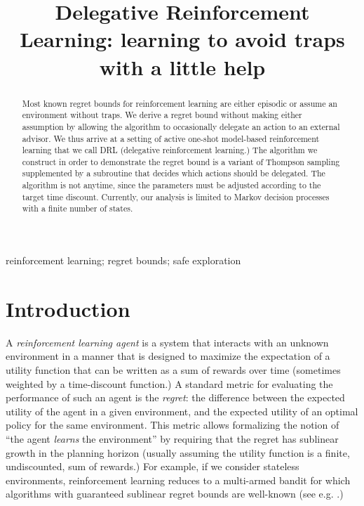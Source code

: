 \documentclass[anon,12pt]{colt2018} %
\title[Delegative Reinforcement Learning]{Delegative Reinforcement Learning: learning to avoid traps\\ with a little help}
\newcommand{\Comment}[1]{}
\begin{document}
\maketitle

\begin{abstract}
Most known regret bounds for reinforcement learning are either episodic or assume an environment without traps. We derive a regret bound without making either assumption by allowing the algorithm to occasionally delegate an action to an external advisor. We thus arrive at a setting of active one-shot model-based reinforcement learning that we call DRL (delegative reinforcement learning.) The algorithm we construct in order to demonstrate the regret bound is a variant of Thompson sampling supplemented by a subroutine that decides which actions should be delegated. The algorithm is not anytime, since the parameters must be adjusted according to the target time discount. \Comment{We also demonstrate that this setting can handle situations in which the reward signal and the advisor become unreliable in particular environment states (assuming these states can be avoided.) }Currently, our analysis is limited to Markov decision processes with a finite number of states.
\end{abstract}

\begin{keywords}
reinforcement learning; regret bounds; safe exploration
\end{keywords}

\section{Introduction}

A \emph{reinforcement learning agent} is a system that interacts with an unknown environment in a manner that is designed to maximize the expectation of a utility function that can be written as a sum of rewards over time (sometimes weighted by a time-discount function.) A standard metric for evaluating the performance of such an agent is the \emph{regret}: the difference between the expected utility of the agent in a given environment, and the expected utility of an optimal policy for the same environment. This metric allows formalizing the notion of \enquote{the agent \emph{learns} the environment} by requiring that the regret has sublinear growth in the planning horizon (usually assuming the utility function is a finite, undiscounted, sum of rewards.) For example, if we consider stateless environments, reinforcement learning reduces to a multi-armed bandit for which algorithms with guaranteed sublinear regret bounds are well-known (see e.g. \cite{Bubeck2012}.)
\end{document}
